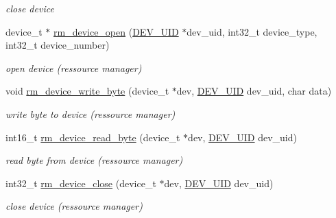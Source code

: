 \begin{CompactItemize}
\begin{CompactList}\small\item\em close device \item\end{CompactList}\item 
device\_\-t $\ast$ \hyperlink{group___d_e_v_i_c_e___a_p_i_g2b7371d08d6707e136b6027980c5e49f}{rm\_\-device\_\-open} (\hyperlink{group___d_e_v_i_c_e___a_p_i_g9f427f7fc1dc07b788af60c2aaa6b8d3}{DEV\_\-UID} $\ast$dev\_\-uid, int32\_\-t device\_\-type, int32\_\-t device\_\-number)
\begin{CompactList}\small\item\em open device (ressource manager) \item\end{CompactList}\item 
void \hyperlink{group___d_e_v_i_c_e___a_p_i_g21fbe79e12278075a0999eb4650db12e}{rm\_\-device\_\-write\_\-byte} (device\_\-t $\ast$dev, \hyperlink{group___d_e_v_i_c_e___a_p_i_g9f427f7fc1dc07b788af60c2aaa6b8d3}{DEV\_\-UID} dev\_\-uid, char data)
\begin{CompactList}\small\item\em write byte to device (ressource manager) \item\end{CompactList}\item 
int16\_\-t \hyperlink{group___d_e_v_i_c_e___a_p_i_gf62d9b836db6b6a2d17d6b6f86c556d2}{rm\_\-device\_\-read\_\-byte} (device\_\-t $\ast$dev, \hyperlink{group___d_e_v_i_c_e___a_p_i_g9f427f7fc1dc07b788af60c2aaa6b8d3}{DEV\_\-UID} dev\_\-uid)
\begin{CompactList}\small\item\em read byte from device (ressource manager) \item\end{CompactList}\item 
int32\_\-t \hyperlink{group___d_e_v_i_c_e___a_p_i_g43618e7de934afd7241ae12191fb15d2}{rm\_\-device\_\-close} (device\_\-t $\ast$dev, \hyperlink{group___d_e_v_i_c_e___a_p_i_g9f427f7fc1dc07b788af60c2aaa6b8d3}{DEV\_\-UID} dev\_\-uid)
\begin{CompactList}\small\item\em close device (ressource manager) \item\end{CompactList}\end{CompactItemize}
